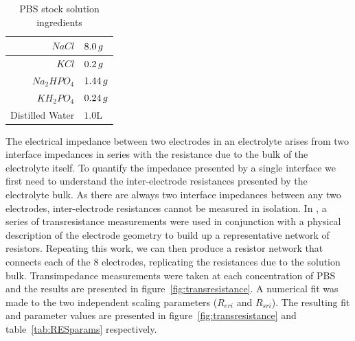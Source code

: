\documentclass[10pt,final,journal]{IEEEtran}
\begin{document}
\begin{table}
    \begin{center}
        \begin{tabular}{|r|l|}
            \hline
            $NaCl$ & $8.0\thinspace g$ \\ \hline
            $KCl$ & $0.2\thinspace g$ \\ \hline
            $Na_{2}HPO_{4}$ & $1.44\thinspace g$ \\ \hline
            $KH_{2}PO_{4}$ & $0.24\thinspace g$ \\ \hline
            Distilled Water & $1.0$\thinspace L \\ \hline
        \end{tabular}
    \end{center}
    \caption{PBS stock solution ingredients}
    \label{tab:PBSrecipe}
\end{table}

The electrical impedance between two electrodes in an electrolyte arises from two interface impedances in series with the resistance due to the bulk of the electrolyte itself. To quantify the impedance presented by a single interface we first need to understand the inter-electrode resistances presented by the electrolyte bulk. As there are always two interface impedances between any two electrodes, inter-electrode resistances cannot be measured in isolation. 
In \cite{ScottSingle2013}, a series of transresistance measurements were used in conjunction with a physical description of the electrode geometry to build up a representative network of resistors. Repeating this work, we can then produce a resistor network that connects each of the 8 electrodes, replicating the resistances due to the solution bulk. Transimpedance measurements were taken at each concentration of PBS and the results are presented in figure~\ref{fig:transresistance}.
A numerical fit was made to the two independent scaling parameters ($R_{eri}$ and $R_{sri}$).  The resulting fit and parameter values are presented in figure~\ref{fig:transresistance} and table~\ref{tab:RESparams} respectively.
\end{document}
